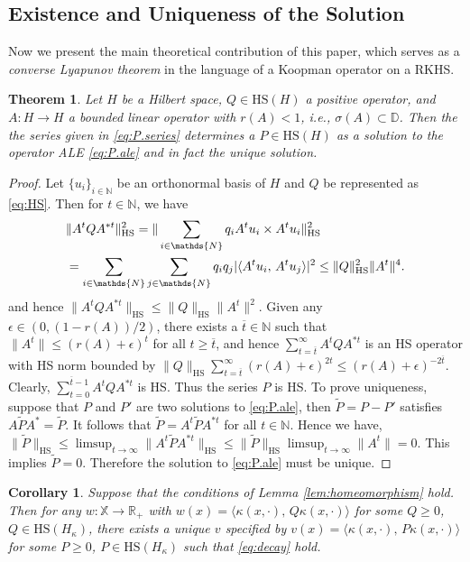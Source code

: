 \documentclass[english]{cccconf}
\renewcommand{\emph}[1]{\textit{#1}}
\newtheorem{theorem}{Theorem}
\newtheorem{corollary}{Corollary}
\newcommand{\mr}[1]{\mathrm{#1}}
\newcommand{\mbb}[1]{\mathds{#1}} %
\newcommand{\mR}{\mbb{R}}
\newcommand{\mN}{\mbb{N}}
\newcommand{\mD}{\mbb{D}}
\newcommand{\mX}{\mbb{X}}
\newcommand{\ip}[2]{\langle #1, \, #2 \rangle}
\begin{document}
\subsection{Existence and Uniqueness of the Solution}
Now we present the main theoretical contribution of this paper, which serves as a \emph{converse Lyapunov theorem} in the language of a Koopman operator on a RKHS. 
\begin{theorem}
    Let $H$ be a Hilbert space, $Q\in \mr{HS}(H)$ a positive operator, and $A: H\rightarrow H$ a bounded linear operator with $r(A)<1$, i.e., $\sigma(A)\subset \mD$. Then the the series given in \eqref{eq:P.series} determines a $P\in \mr{HS}(H)$ as a solution to the operator ALE \eqref{eq:P.ale} and in fact the unique solution.  
\end{theorem}
\begin{proof}
    Let $\{u_i\}_{i\in \mN}$ be an orthonormal basis of $H$ and $Q$ be represented as \eqref{eq:HS}. Then for $t\in \mN$, we have
    \begin{align*} 
    \textstyle 
        &\|A^tQA^{\ast t}\|_{\mr{HS}}^2 = \|\sum_{i\in \mN} q_i A^tu_i\times A^tu_i \|_{\mr{HS}}^2 \\
        &= \sum_{i\in \mN}\sum_{j\in \mN} q_iq_j|\ip{A^tu_i}{A^tu_j}|^2 \leq \|Q\|_{\mr{HS}}^2\|A^t\|^4. 
    \end{align*}
    and hence $\|A^tQA^{\ast t}\|_{\mr{HS}} \leq \|Q\|_{\mr{HS}}\|A^t\|^2$. Given any $\epsilon \in (0, (1-r(A))/2)$, there exists a $\overline{t}\in \mN$ such that $\|A^t\|\leq (r(A)+\epsilon)^t$ for all $t\geq \overline{t}$, and hence $\sum_{t=\overline{t}}^\infty A^tQA^{\ast t}$ is an HS operator with HS norm bounded by $\|Q\|_{\mr{HS}} \sum_{t=\overline{t}}^\infty (r(A)+\epsilon)^{2t} \leq (r(A)+\epsilon)^{-2\overline{t}}$. 
    Clearly, $\sum_{t=0}^{\overline{t}-1} A^tQA^{\ast t}$ is HS. Thus the series $P$ is HS. To prove uniqueness, suppose that $P$ and $P'$ are two solutions to \eqref{eq:P.ale}, then $\tilde{P} = P-P'$ satisfies $A\tilde{P}A^\ast = \tilde{P}$. It follows that $\tilde{P} = A^t\tilde{P}A^{\ast t}$ for all $t\in \mN$. Hence we have, 
    $\|\tilde{P}\|_{\mr{HS}} \leq \limsup_{t\rightarrow \infty} \|A^t\tilde{P}A^{\ast t}\|_{\mr{HS}} \leq \|\tilde{P}\|_{\mr{HS}}\limsup_{t\rightarrow \infty} \|A^t\| = 0.$ This implies $\tilde{P}=0$. Therefore the solution to \eqref{eq:P.ale} must be unique. 
\end{proof}
\begin{corollary}
    Suppose that the conditions of Lemma \ref{lem:homeomorphism} hold. Then for any $w:\mX\rightarrow \mR_+$ with $w(x)=\ip{\kappa(x, \cdot)}{Q\kappa(x, \cdot)}$ for some $Q\geq 0$, $Q\in \mr{HS}(H_\kappa)$, there exists a unique $v$ specified by $v(x)=\ip{\kappa(x, \cdot)}{P\kappa(x, \cdot)}$ for some $P\geq 0$, $P\in \mr{HS}(H_\kappa)$ such that \eqref{eq:decay} hold. 
\end{corollary}
\end{document}

